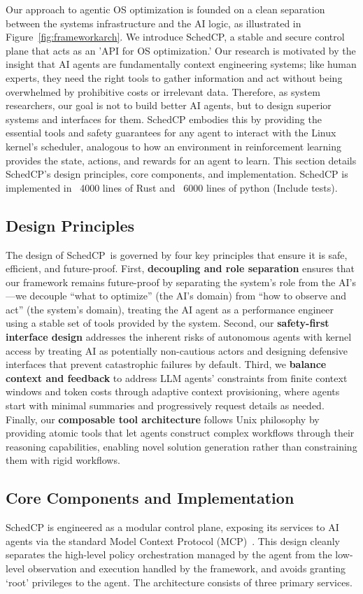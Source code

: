 \documentclass[preprint]{article}
\newcommand{\sys}{SchedCP\xspace}
\begin{document}
Our approach to agentic OS optimization is founded on a clean separation between the systems infrastructure and the AI logic, as illustrated in Figure~\ref{fig:frameworkarch}. We introduce \sys, a stable and secure control plane that acts as an 'API for OS optimization.' Our research is motivated by the insight that AI agents are fundamentally context engineering systems; like human experts, they need the right tools to gather information and act without being overwhelmed by prohibitive costs or irrelevant data. Therefore, as system researchers, our goal is not to build better AI agents, but to design superior systems and interfaces for them. \sys embodies this by providing the essential tools and safety guarantees for any agent to interact with the Linux kernel's scheduler, analogous to how an environment in reinforcement learning provides the state, actions, and rewards for an agent to learn. This section details \sys's design principles, core components, and implementation. \sys is implemented in ~4000 lines of Rust and ~6000 lines of python (Include tests).

\subsection{Design Principles}
The design of \sys\ is governed by four key principles that ensure it is safe, efficient, and future-proof. First, \textbf{decoupling and role separation} ensures that our framework remains future-proof by separating the system's role from the AI's—we decouple ``what to optimize'' (the AI's domain) from ``how to observe and act'' (the system's domain), treating the AI agent as a performance engineer using a stable set of tools provided by the system. Second, our \textbf{safety-first interface design} addresses the inherent risks of autonomous agents with kernel access by treating AI as potentially non-cautious actors and designing defensive interfaces that prevent catastrophic failures by default. Third, we \textbf{balance context and feedback} to address LLM agents' constraints from finite context windows and token costs through adaptive context provisioning, where agents start with minimal summaries and progressively request details as needed. Finally, our \textbf{composable tool architecture} follows Unix philosophy by providing atomic tools that let agents construct complex workflows through their reasoning capabilities, enabling novel solution generation rather than constraining them with rigid workflows.

\subsection{Core Components and Implementation}
\sys is engineered as a modular control plane, exposing its services to AI agents via the standard Model Context Protocol (MCP)~\cite{anthropic2024mcp}. This design cleanly separates the high-level policy orchestration managed by the agent from the low-level observation and execution handled by the framework, and avoids granting `root' privileges to the agent. The architecture consists of three primary services.
\end{document}

